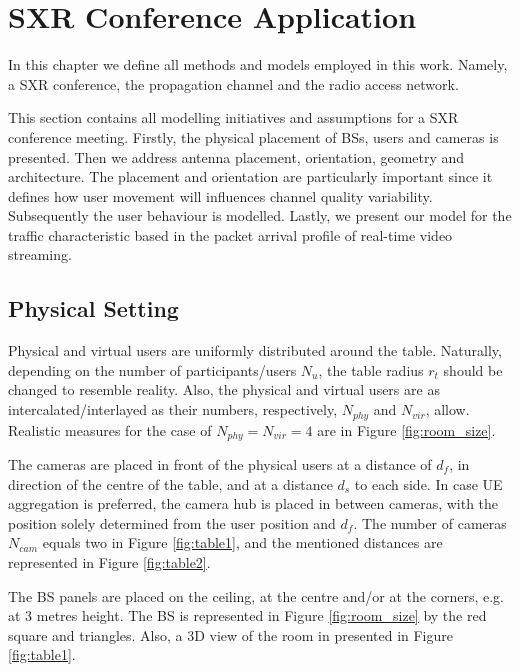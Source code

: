 \section{SXR Conference Application}
\label{sec:sxr_meeting_modelling}
In this chapter we define all methods and models employed in this work. Namely, a SXR conference, the propagation channel and the radio access network. 

This section contains all modelling initiatives and assumptions for a SXR conference meeting. Firstly, the physical placement of \acp{BS}, users and cameras is presented. Then we address antenna placement, orientation, geometry and architecture. The placement and orientation are particularly important since it defines how user movement will influences channel quality variability. Subsequently the user behaviour is modelled. Lastly, we present our model for the traffic characteristic based in the packet arrival profile of real-time video streaming.

\subsection{Physical Setting}
\label{sec:ue_placement}

Physical and virtual users are uniformly distributed around the table. Naturally, depending on the number of participants/users $N_{u}$, the table radius $r_{t}$ should be changed to resemble reality. Also, the physical and virtual users are as intercalated/interlayed as their numbers, respectively, $N_{phy}$ and $N_{vir}$, allow. Realistic measures for the case of $N_{phy} = N_{vir} = 4$ are in Figure \ref{fig:room_size}.


The cameras are placed in front of the physical users at a distance of $d_f$, in direction of the centre of the table, and at a distance $d_s$ to each side. In case \ac{UE} aggregation is preferred, the camera hub is placed in between cameras, with the position solely determined from the user position and $d_f$. The number of cameras $N_{cam}$ equals two in Figure \ref{fig:table1}, and the mentioned distances are represented in Figure \ref{fig:table2}.

The \ac{BS} panels are placed on the ceiling, at the centre and/or at the corners, e.g. at 3 metres height. The BS is represented in Figure \ref{fig:room_size} by the red square and triangles. Also, a 3D view of the room in presented in Figure \ref{fig:table1}.

